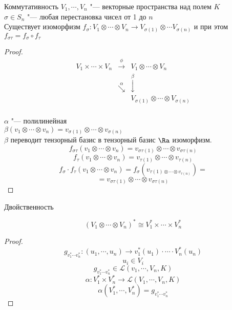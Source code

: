 \begin{theorem}{Коммутативность} \hfill
$V_1, \cdots, V_n$ "--- векторные пространства над полем $K$\\
$\sigma \in S_n$ "--- любая перестановка чисел от 1 до $n$\\
Существует изоморфизм $f_{\sigma}\colon V_1 \otimes \cdots \otimes V_n \to V_{\sigma(1)} \otimes \cdots V_{\sigma(n)}$
и при этом  $f_{\sigma \tau} = f_{\sigma} \circ f_{\tau}$
\end{theorem}
\begin{proof}
$$
\begin{matrix}
V_1 \times \cdots \times V_n& \overset{\phi}{\rightarrow}& V_1 \otimes \cdots \otimes V_n\\
&\overset{\alpha}{\searrow}&\overset{\beta}{\downarrow}\\
&&V_{\sigma(1)} \otimes \cdots \otimes V_{\sigma(n)}\\
\end{matrix}
$$

$\alpha$ "--- полилинейная \\
$\beta(v_1 \otimes \cdots \otimes v_n) = v_{\sigma(1)} \otimes \cdots \otimes v_{\sigma(n)}$\\
$\beta$ переводит тензорный базис в тензорный базис $\Ra$ изоморфизм.\\

$$f_{\sigma \tau}(v_1 \otimes \cdots \otimes v_n) = v_{\sigma\tau(1)} \otimes \cdots \otimes v_{\sigma \tau(n)}$$
$$f_{\tau}(v_1 \otimes \cdots \otimes v_n) = v_{\tau(1)} \otimes \cdots \otimes v_{\tau(n)} $$
$$f_{\sigma}\cdot f_{\tau}(v_1 \otimes \cdots \otimes v_n) = f_{\sigma}(v_{\tau(1) \otimes \cdots \otimes v_{\tau(n)}}) =$$
$$= v_{\sigma\tau(1)} \otimes \cdots \otimes v_{\sigma \tau(n)}$$
\end{proof}

\begin{theorem}{Двойственность}\hfill

$$(V_1 \otimes \cdots \otimes V_n)^* \cong V_1^* \times \cdots \times V_n^*$$

\end{theorem}
\begin{proof}
$$g_{v_1^* \cdots v_n^*} \colon (u_1, \cdots, u_n) \to v_1^*(u_1) \cdot \cdots \cdot V_n^*(u_n)$$
$$u_i \in V_i$$
$$g_{v_1^* \cdots v_n^*} \in \mathcal{L}(v_1, \cdots, V_n, K) $$
$$\alpha \colon V_1^* \times V_n^* \to \mathcal{L}(V_1, \cdots, V_n, K) $$
$$\alpha(V_1^*, \cdots, V_n^*) = g_{v_1^* \cdots v_n^*} $$
\end{proof}

